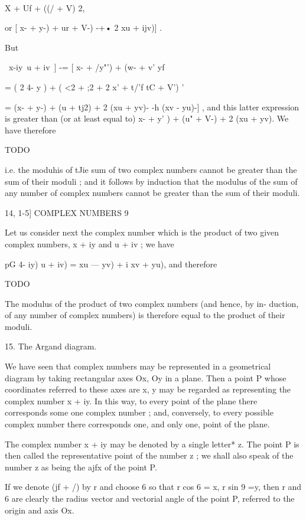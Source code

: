 \ \ {X + Uf + ((/ + V)   2, 

or [ x- + y-) +  ur + V-) -+• 2  xu + ijv)] . 

But 

 \ x-\-iy\-\-\ u + iv\ ] -= [ x- + /y"')  + (w- + v' yf 

= ( 2 4- y ) + ( <2 +  ;2  + 2  x' + t/'f  tC + V') ' 

= (x- + y-) + (u  + tj2) + 2  (xu + yv)- -h (xv - yu)-] , 
and this latter expression is greater than (or at least equal to) 
 x- + y' ) + (u" + V-) + 2 (xu + yv). 
We have therefore 

TODO

i.e. the moduhis of tJie sum of two complex numbers cannot be greater than the 
sum of their moduli ; and it follows by induction that the modulus of the sum 
of any number of complex numbers cannot be greater than the sum of their 
moduli. 



14, 1-5] COMPLEX NUMBERS 9 

Let us consider next the complex number which is the product of two 
given complex numbers, x + iy and u + iv ; we have 

 pG 4- iy)  u + iv) =  xu — yv) + i  xv + yu), 
and therefore 

TODO

The modulus of the product of two complex numbers (and hence, by in- 
duction, of any number of complex numbers) is therefore equal to the product 
of their moduli. 

15. The Argand diagram. 

We have seen that complex numbers may be represented in a geometrical 
diagram by taking rectangular axes Ox, Oy in a plane. Then a point P 
whose coordinates referred to these axes are x, y may be regarded as 
representing the complex number x + iy. In this way, to every point of 
the plane there corresponds some one complex number ; and, conversely, to 
every possible complex number there corresponds one, and only one, point 
of the plane. 

The complex number x + iy may be denoted by a single letter* z. The 
point P is then called the representative point of the number z ; we shall 
also speak of the number z as being the ajfx of the point P. 

If we denote (jf + /)  by r and choose 6 so that r cos 6 = x, r sin 9 =y, 
then r and 6 are clearly the radius vector and vectorial angle of the point P, 
referred to the origin and axis Ox. 

}
